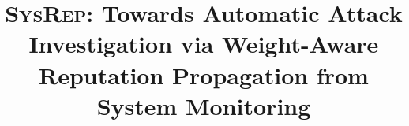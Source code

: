 \documentclass[letterpaper,twocolumn,10pt]{article}
\newcommand{\tool}{\textsc{SysRep}\xspace}
\begin{document}
\title{\tool: Towards Automatic Attack Investigation via Weight-Aware Reputation Propagation from System Monitoring}





\maketitle


% 









% 


\end{document}
